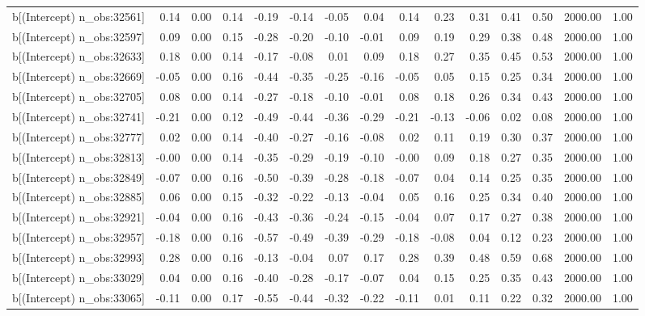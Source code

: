 \begin{table}[ht]
\begin{tabular}{rrrrrrrrrrrrrrr}
  b[(Intercept) n\_obs:32561] & 0.14 & 0.00 & 0.14 & -0.19 & -0.14 & -0.05 & 0.04 & 0.14 & 0.23 & 0.31 & 0.41 & 0.50 & 2000.00 & 1.00 \\ 
  b[(Intercept) n\_obs:32597] & 0.09 & 0.00 & 0.15 & -0.28 & -0.20 & -0.10 & -0.01 & 0.09 & 0.19 & 0.29 & 0.38 & 0.48 & 2000.00 & 1.00 \\ 
  b[(Intercept) n\_obs:32633] & 0.18 & 0.00 & 0.14 & -0.17 & -0.08 & 0.01 & 0.09 & 0.18 & 0.27 & 0.35 & 0.45 & 0.53 & 2000.00 & 1.00 \\ 
  b[(Intercept) n\_obs:32669] & -0.05 & 0.00 & 0.16 & -0.44 & -0.35 & -0.25 & -0.16 & -0.05 & 0.05 & 0.15 & 0.25 & 0.34 & 2000.00 & 1.00 \\ 
  b[(Intercept) n\_obs:32705] & 0.08 & 0.00 & 0.14 & -0.27 & -0.18 & -0.10 & -0.01 & 0.08 & 0.18 & 0.26 & 0.34 & 0.43 & 2000.00 & 1.00 \\ 
  b[(Intercept) n\_obs:32741] & -0.21 & 0.00 & 0.12 & -0.49 & -0.44 & -0.36 & -0.29 & -0.21 & -0.13 & -0.06 & 0.02 & 0.08 & 2000.00 & 1.00 \\ 
  b[(Intercept) n\_obs:32777] & 0.02 & 0.00 & 0.14 & -0.40 & -0.27 & -0.16 & -0.08 & 0.02 & 0.11 & 0.19 & 0.30 & 0.37 & 2000.00 & 1.00 \\ 
  b[(Intercept) n\_obs:32813] & -0.00 & 0.00 & 0.14 & -0.35 & -0.29 & -0.19 & -0.10 & -0.00 & 0.09 & 0.18 & 0.27 & 0.35 & 2000.00 & 1.00 \\ 
  b[(Intercept) n\_obs:32849] & -0.07 & 0.00 & 0.16 & -0.50 & -0.39 & -0.28 & -0.18 & -0.07 & 0.04 & 0.14 & 0.25 & 0.35 & 2000.00 & 1.00 \\ 
  b[(Intercept) n\_obs:32885] & 0.06 & 0.00 & 0.15 & -0.32 & -0.22 & -0.13 & -0.04 & 0.05 & 0.16 & 0.25 & 0.34 & 0.40 & 2000.00 & 1.00 \\ 
  b[(Intercept) n\_obs:32921] & -0.04 & 0.00 & 0.16 & -0.43 & -0.36 & -0.24 & -0.15 & -0.04 & 0.07 & 0.17 & 0.27 & 0.38 & 2000.00 & 1.00 \\ 
  b[(Intercept) n\_obs:32957] & -0.18 & 0.00 & 0.16 & -0.57 & -0.49 & -0.39 & -0.29 & -0.18 & -0.08 & 0.04 & 0.12 & 0.23 & 2000.00 & 1.00 \\ 
  b[(Intercept) n\_obs:32993] & 0.28 & 0.00 & 0.16 & -0.13 & -0.04 & 0.07 & 0.17 & 0.28 & 0.39 & 0.48 & 0.59 & 0.68 & 2000.00 & 1.00 \\ 
  b[(Intercept) n\_obs:33029] & 0.04 & 0.00 & 0.16 & -0.40 & -0.28 & -0.17 & -0.07 & 0.04 & 0.15 & 0.25 & 0.35 & 0.43 & 2000.00 & 1.00 \\ 
  b[(Intercept) n\_obs:33065] & -0.11 & 0.00 & 0.17 & -0.55 & -0.44 & -0.32 & -0.22 & -0.11 & 0.01 & 0.11 & 0.22 & 0.32 & 2000.00 & 1.00 \\ 

\end{tabular}
\end{table}
